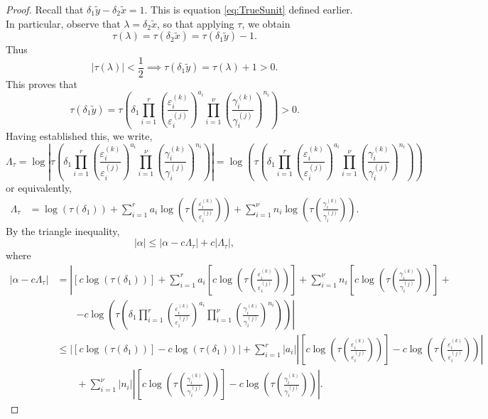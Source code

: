 \begin{proof}
Recall that $\delta_1\tilde{y} - \delta_2\tilde{x} = 1$. This is equation \eqref{eq:TrueSunit} defined earlier. In particular, observe that $\lambda = \delta_2\tilde{x}$, so that applying $\tau$, we obtain
\[\tau(\lambda) = \tau(\delta_2\tilde{x}) = \tau(\delta_1\tilde{y}) - 1.\]
Thus
\[|\tau(\lambda)| < \frac{1}{2} \implies \tau(\delta_1\tilde{y}) = \tau(\lambda) + 1 > 0.\]
This proves that
\[\tau(\delta_1\tilde{y}) = \tau\left(\delta_1 \prod_{i = 1}^r\left( \frac{\varepsilon_i^{(k)}}{\varepsilon_i^{(j)}}\right)^{a_i}\prod_{i = 1}^{\nu} \left( \frac{\gamma_i^{(k)}}{\gamma_i^{(j)}}\right)^{n_i}\right) > 0.\]
Having established this, we write, 
\[\Lambda_{\tau} = \log\left|\tau\left(\delta_1 \prod_{i = 1}^r\left( \frac{\varepsilon_i^{(k)}}{\varepsilon_i^{(j)}}\right)^{a_i}\prod_{i = 1}^{\nu} \left( \frac{\gamma_i^{(k)}}{\gamma_i^{(j)}}\right)^{n_i}\right)\right|= \log\left(\tau\left(\delta_1 \prod_{i = 1}^r\left( \frac{\varepsilon_i^{(k)}}{\varepsilon_i^{(j)}}\right)^{a_i}\prod_{i = 1}^{\nu} \left( \frac{\gamma_i^{(k)}}{\gamma_i^{(j)}}\right)^{n_i}\right)\right) \]
or equivalently, 
\begin{align*}
\Lambda_{\tau}	
	& = \log\left(\tau\left(\delta_1\right)\right) + \sum_{i=1}^r a_i\log\left(\tau\left( \frac{\varepsilon_i^{(k)}}{\varepsilon_i^{(j)}}\right) \right) + \sum_{i=1}^{\nu}n_i\log \left(\tau\left( \frac{\gamma_i^{(k)}}{\gamma_i^{(j)}}\right)\right).
\end{align*}
By the triangle inequality, 
\[|\alpha| \leq |\alpha - c\Lambda_{\tau}| + c|\Lambda_{\tau}|,\]
where
\begin{align*}
|\alpha-c\Lambda_\tau|
	& = \left|[c\log(\tau(\delta_1))] +\sum_{i = 1}^r a_i \left[c\log\left(\tau\left(\frac{\varepsilon_i^{(k)}}{\varepsilon_i^{(j)}}\right)\right)\right] + \sum_{i = 1}^{\nu} n_i \left[c\log\left(\tau\left(\frac{\gamma_i^{(k)}}{\gamma_i^{(j)}}\right)\right)\right]\right. +\\
	& \quad \quad \left. - c \log\left(\tau\left(\delta_1 \prod_{i = 1}^r\left( \frac{\varepsilon_i^{(k)}}{\varepsilon_i^{(j)}}\right)^{a_i}\prod_{i = 1}^{\nu} \left( \frac{\gamma_i^{(k)}}{\gamma_i^{(j)}}\right)^{n_i}\right)\right)\right|\\
	& \leq \left| [c\log(\tau(\delta_1))] - c\log\left(\tau\left(\delta_1\right)\right)\right| + \sum_{i = 1}^r |a_i|\left| \left[c\log\left(\tau\left(\frac{\varepsilon_i^{(k)}}{\varepsilon_i^{(j)}}\right)\right)\right] - c\log\left(\tau\left( \frac{\varepsilon_i^{(k)}}{\varepsilon_i^{(j)}}\right) \right)\right| \\
	& \quad \quad +  \sum_{i = 1}^{\nu} |n_i|\left| \left[c\log\left(\tau\left(\frac{\gamma_i^{(k)}}{\gamma_i^{(j)}}\right)\right)\right] - c\log \left(\tau\left( \frac{\gamma_i^{(k)}}{\gamma_i^{(j)}}\right)\right)\right|.

\end{align*}
\end{proof}

